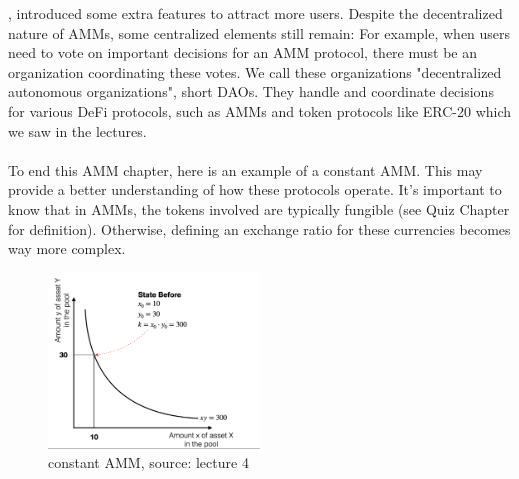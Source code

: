 \documentclass{article}
\begin{document}
, introduced some extra features to attract more users.  Despite the decentralized nature of AMMs, some centralized elements still remain: For example, when users need to vote on important decisions for an AMM protocol, there must be an organization coordinating these votes. We call these organizations "decentralized autonomous organizations", short DAOs.  They handle and coordinate decisions for various DeFi protocols, such as AMMs and token protocols like ERC-20 which we saw in the lectures.\\
\\
To end this AMM chapter, here is an example of a constant AMM. This may provide a better understanding of how these protocols operate. It's important to know that in AMMs, the tokens involved are typically fungible (see Quiz Chapter for definition). Otherwise, defining an exchange ratio for these currencies becomes way more complex.
\begin{figure}[h]
    \centering
    \includegraphics[width=0.5\textwidth]{Bildschirmfoto 2024-04-02 um 15.16.43.png} %
    \caption{constant AMM, \scriptsize{source: lecture 4}}
    \label{fig:DoS-attack}
\end{figure}
\end{document}
